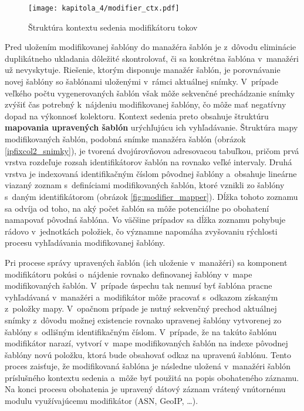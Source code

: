 \begin{figure}[ht]
    \centering
    \texttt{[image: kapitola\_4/modifier\_ctx.pdf]}
    \caption{Štruktúra kontextu sedenia modifikátoru tokov}
    \label{fig:modifier_ctx}
\end{figure}

Pred uložením modifikovanej šablóny do manažéra šablón je z~dôvodu eliminácie duplikátneho ukladania dôležité skontrolovať, či sa konkrétna šablóna v~manažéri už nevyskytuje. Riešenie, ktorým disponuje manažér šablón, je porovnávanie
novej šablóny so šablónami uloženými v~rámci aktuálnej snímky. V~prípade veľkého počtu vygenerovaných šablón však môže sekvenčné prechádzanie snímky zvýšiť čas potrebný k~nájdeniu modifikovanej šablóny, čo môže mať negatívny dopad na
výkonnosť kolektoru. Kontext sedenia preto obsahuje štruktúru \textbf{mapovania upravených šablón} urýchľujúcu ich vyhľadávanie. Štruktúra mapy modifikovaných šablón, podobná snímke manažéra šablón (obrázok \ref{ipfixcol2_snimky}), je
tvorená dvojúrovňovou adresovacou tabuľkou, pričom prvá vrstva rozdeľuje rozsah identifikátorov šablón na rovnako veľké intervaly. Druhá vrstva je indexovaná identifikačným číslom pôvodnej šablóny a~obsahuje lineárne viazaný zoznam
s~definíciami modifikovaných šablón, ktoré vznikli zo šablóny s~daným identifikátorom (obrázok \ref{fig:modifier_mapper}). Dĺžka tohoto zoznamu sa odvíja od toho, na aký počet šablón sa môže potenciálne po obohatení namapovať pôvodná šablóna.
Vo väčšine prípadov sa dĺžka zoznamu pohybuje rádovo v~jednotkách položiek, čo významne napomáha zvyšovaniu rýchlosti procesu vyhľadávania modifikovanej šablóny.

Pri procese správy upravených šablón (ich uloženie v~manažéri) sa komponent modifikátoru pokúsi o~nájdenie rovnako definovanej šablóny v~mape modifikovaných šablón. V~prípade úspechu tak nemusí byť šablóna pracne vyhľadávaná v~manažéri a~modifikátor môže
pracovať s~odkazom získaným z~položky mapy. V~opačnom prípade je nutný sekvenčný prechod aktuálnej snímky z~dôvodu možnej existencie rovnako upravenej šablóny vytvorenej zo šablóny s~odlišným identifikačným číslom. V~prípade, že na
takúto šablónu modifikátor narazí, vytvorí v~mape modifikovaných šablón na indexe pôvodnej šablóny novú položku, ktorá bude obsahovať odkaz na upravenú šablónu. Tento proces zaisťuje, že modifikovaná šablóna je následne uložená v~manažéri šablón
príslušného kontextu sedenia a~môže byť použitá na popis obohateného záznamu. Na konci procesu obohatenia je upravený dátový záznam vrátený vnútornému modulu využívajúcemu modifikátor (ASN, GeoIP, \ldots).


